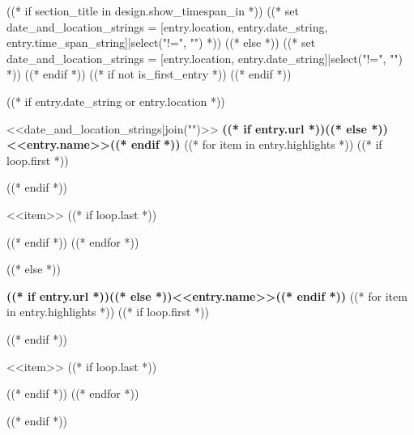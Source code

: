 ((* if section_title in design.show_timespan_in *))
    ((* set date_and_location_strings = [entry.location, entry.date_string, entry.time_span_string]|select("!=", "") *))
((* else *))
    ((* set date_and_location_strings = [entry.location, entry.date_string]|select("!=", "") *))
((* endif *))
((* if not is_first_entry *))
\vspace{<<design.margins.entry_area.vertical_between>>}
((* endif *))

((* if entry.date_string or entry.location *))
\begin{twocolentry}{
    <<date_and_location_strings|join("\n\n")>>
}
    \textbf{((* if entry.url *))((* else *))<<entry.name>>((* endif *))}
    ((* for item in entry.highlights *))
        ((* if loop.first *))
    \begin{highlights}
        ((* endif *))
        \item <<item>>
        ((* if loop.last *))
    \end{highlights}
        ((* endif *))
    ((* endfor *))
\end{twocolentry}
((* else *))
\begin{onecolentry}
    \textbf{((* if entry.url *))((* else *))<<entry.name>>((* endif *))}
    ((* for item in entry.highlights *))
        ((* if loop.first *))
    \begin{highlights}
        ((* endif *))
        \item <<item>>
        ((* if loop.last *))
    \end{highlights}
        ((* endif *))
    ((* endfor *))
\end{onecolentry}
((* endif *))
